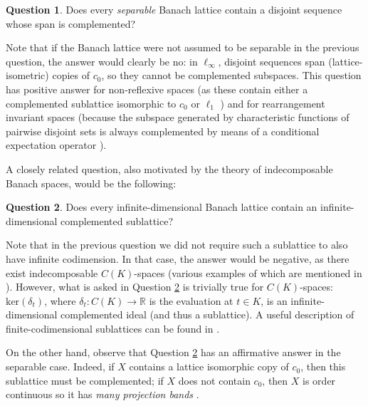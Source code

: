 \documentclass[11pt]{amsart}
\theoremstyle{definition}
\newtheorem{question}{Question}
\numberwithin{equation}{section}
\begin{document}
\begin{question}
    Does every \textit{separable} Banach lattice contain a disjoint sequence whose span is complemented?
\end{question}

Note that if the Banach lattice were not assumed to be separable in the previous question, the answer would clearly be no: in $\ell_\infty$, disjoint sequences span (lattice-isometric) copies of $c_0$, so they cannot be complemented subspaces. This question has positive answer for non-reflexive spaces (as these contain either a complemented sublattice isomorphic to $c_0$ or $\ell_1$ \cite[Proposition 2.3.11 and Theorem 2.4.15]{M-N-book}) and for rearrangement invariant spaces (because the subspace generated by characteristic functions of pairwise disjoint sets is always complemented by means of a conditional expectation operator \cite[Theorem 2.a.4]{LT2-book}).

A closely related question, also motivated by the theory of indecomposable Banach spaces, would be the following: 

\begin{question}\label{question:sublattice-complemented}
    Does every infinite-dimensional Banach lattice contain an infinite-dimensional complemented sublattice?
\end{question}


Note that in the previous question we did not require such a sublattice to also have infinite codimension. In that case, the answer would be negative, as there exist indecomposable $C(K)$-spaces (various examples of which are mentioned in \cite{Koszmider-survey}). However, what is asked in Question \ref{question:sublattice-complemented} is trivially true for $C(K)$-spaces: $\text{ker}(\delta_t)$, where $\delta_t:C(K)\to\mathbb{R}$ is the evaluation at $t\in K$, is an infinite-dimensional complemented ideal (and thus a sublattice). A useful description of finite-codimensional sublattices can be found in \cite[Section 5]{BT24}. 

On the other hand, observe that Question \ref{question:sublattice-complemented} has an affirmative answer in the separable case. Indeed, if $X$ contains a lattice isomorphic copy of $c_0$, then this sublattice must be complemented; if $X$ does not contain $c_0$, then $X$ is order continuous so it has \textit{many projection bands} \cite[Theorem 1.a.13]{LT2-book}.


\end{document}
